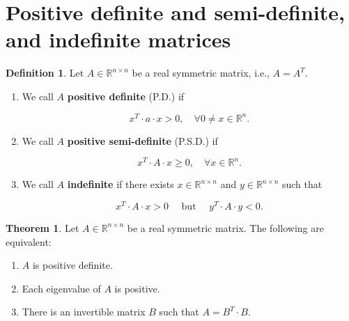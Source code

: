 \documentclass[12pt]{article}
\theoremstyle{definition}
\newtheorem*{definition}{Definition}
\newtheorem{theorem}{Theorem}[section]  %
\begin{document}
\section{Positive definite and semi-definite, and indefinite matrices}

\begin{definition}
Let $A \in \mathbb{R}^{n \times n}$ be a real symmetric matrix, i.e., $A = A^T$.

\begin{enumerate}[label = (\arabic*)]
\item We call $A$ \textbf{positive definite} (P.D.) if

\[ x^T \cdot a \cdot x > 0, \quad \forall 0 \neq x \in \mathbb{R}^n. \]

\item We call $A$ \textbf{positive semi-definite} (P.S.D.) if

\[ x^T \cdot A \cdot x \geq 0, \quad \forall x \in \mathbb{R}^n. \]

\item We call $A$ \textbf{indefinite} if there exists $x \in \mathbb{R}^{n \times n}$ and
$y \in \mathbb{R}^{n \times n}$ such that

\[ x^T \cdot A \cdot x > 0 \quad \text{ but } \quad y^T \cdot A \cdot y < 0. \] 

\end{enumerate}
\end{definition}

\begin{theorem}
Let $A \in \mathbb{R}^{n \times n}$ be a real symmetric matrix. The following are
equivalent:

\begin{enumerate}[label = (\arabic*)]
\item $A$ is positive definite.
\item Each eigenvalue of $A$ is positive.
\item There is an invertible matrix $B$ such that $A = B^T \cdot B$.
\end{enumerate}
\end{theorem}
\end{document}
